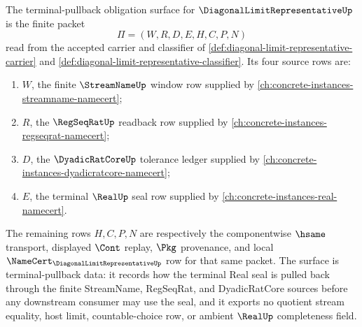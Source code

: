 \begin{definition}
\label{def:diagonal-limit-representative-terminal-pullback-obligation-surface}
The terminal-pullback obligation surface for $\DiagonalLimitRepresentativeUp$ is the finite packet
$$
\Pi=(W,R,D,E,H,C,P,N)
$$
read from the accepted carrier and classifier of \autoref{def:diagonal-limit-representative-carrier} and \autoref{def:diagonal-limit-representative-classifier}. Its four source rows are:
\begin{enumerate}
\item $W$, the finite $\StreamNameUp$ window row supplied by \autoref{ch:concrete-instances-streamname-namecert};
\item $R$, the $\RegSeqRatUp$ readback row supplied by \autoref{ch:concrete-instances-regseqrat-namecert};
\item $D$, the $\DyadicRatCoreUp$ tolerance ledger supplied by \autoref{ch:concrete-instances-dyadicratcore-namecert};
\item $E$, the terminal $\RealUp$ seal row supplied by \autoref{ch:concrete-instances-real-namecert}.
\end{enumerate}
The remaining rows $H,C,P,N$ are respectively the componentwise $\hsame$ transport, displayed $\Cont$ replay, $\Pkg$ provenance, and local $\NameCert_{\DiagonalLimitRepresentativeUp}$ row for that same packet. The surface is terminal-pullback data: it records how the terminal Real seal is pulled back through the finite StreamName, RegSeqRat, and DyadicRatCore sources before any downstream consumer may use the seal, and it exports no quotient stream equality, host limit, countable-choice row, or ambient $\RealUp$ completeness field.
\end{definition}

